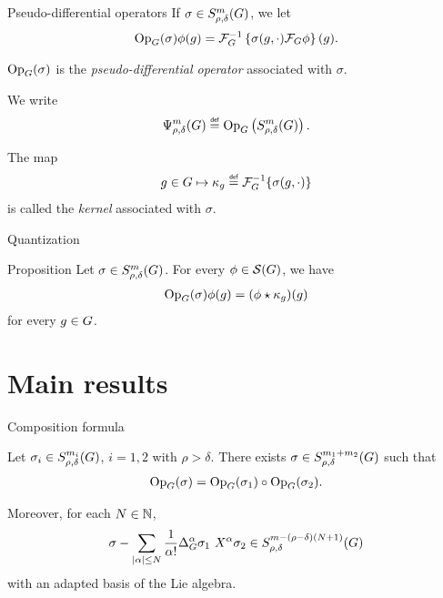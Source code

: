 \documentclass{beamer}
\begin{document}
\begin{frame}{Pseudo-differential operators}
    If $\sigma \in S^{m}_{\rho, \delta}(G)$,
    we let
    \begin{align*}
        \mathrm{Op}_{G}(\sigma) \phi(g) = \mathcal{F}^{-1}_{G} \left\{ \sigma(g, \cdot) \mathcal{F}_{G} \phi \right\}(g).
    \end{align*}

    $\mathrm{Op}_{G}(\sigma)$ is the \emph{pseudo-differential operator} associated with $\sigma$.

    We write
    \begin{align*}
        \OperatorClass m {\rho, \delta} \defeq \Op \left(\SymbolClass m {\rho, \delta}\right).
    \end{align*}

    \pause

    The map
    \begin{align*}
        g \in \Group \mapsto \kappa_g \defeq \InverseFourier \{\sigma(g, \dummy)\}
    \end{align*}
    is called the \emph{kernel} associated with $\sigma$.
\end{frame}

\begin{frame}{Quantization}
    \begin{block}{Proposition}
        Let $\sigma \in S^{m}_{\rho, \delta}(G)$.
        For every $\phi \in {\mathcal{S} (G)}$,
        we have
        \begin{align*}
            \mathrm{Op}_{G}(\sigma) \phi(g) = (\phi \star \kappa_g)(g)
        \end{align*}
        for every $g \in G$.
    \end{block}
\end{frame}

\section{Main results}

\begin{frame}{Composition formula}
    \begin{theorem}
        Let $\sigma_i \in S^{m_i}_{\rho, \delta}(G)$, $i = 1, 2$ with $\rho > \delta$.
        There exists $\sigma \in S^{m_1 + m_2}_{\rho, \delta}(G)$ such that
        \begin{align*}
            \mathrm{Op}_{G}(\sigma) = \mathrm{Op}_{G}(\sigma_1) \circ \mathrm{Op}_{G}(\sigma_2).
        \end{align*}

        Moreover,
        for each $N \in \mathbb{N}$,
        \begin{align*}
            \sigma - \sum_{\abs \alpha \leq N} \frac 1 {\alpha!} \DifferenceOperatorOrder {\alpha} \sigma_1 \ \LeftDifferentialOperator {\alpha} \sigma_2 \in \SymbolClass {m - (\rho - \delta) (N + 1)} {\rho, \delta}
        \end{align*}
        with an adapted basis of the Lie algebra.
    \end{theorem}
\end{frame}
\end{document}
